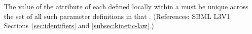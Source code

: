 The value of the  attribute of each \LocalParameter defined locally within
a \KineticLaw must be unique across the set of all such parameter
definitions in that \KineticLaw.  (References: SBML L3V1
Sections~\ref{sec:identifiers} and \ref{subsec:kinetic-law}.)
